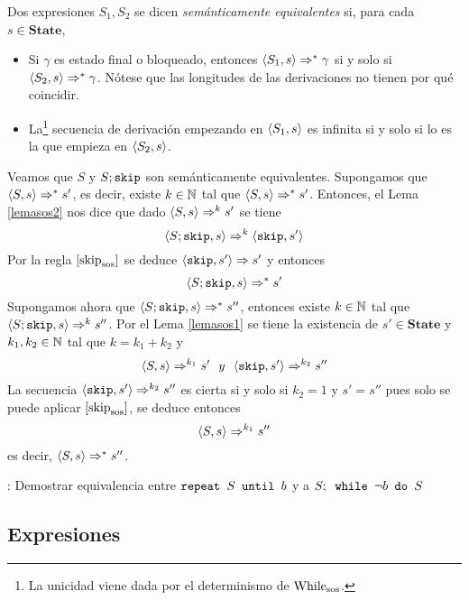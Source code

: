 \begin{definition}
Dos expresiones $S_1, S_2$ se dicen \textit{semánticamente equivalentes} si, para cada $s \in \mathbf{State}$, 
\begin{itemize}
    \item Si $\gamma$ es estado final o bloqueado, entonces $\langle S_1, s \rangle\Rightarrow^* \gamma$ si y solo si $\langle S_2, s \rangle \Rightarrow^*\gamma$. Nótese que las longitudes de las derivaciones no tienen por qué coincidir.
    \item La\footnote{La unicidad viene dada por el determinismo de $\mathrm{While}_{\mathrm{sos}}$.} secuencia de derivación empezando en $\langle S_1, s \rangle$ es infinita si y solo si lo es la que empieza en $\langle S_2, s \rangle$.
\end{itemize} 
\end{definition}

\begin{example}
Veamos que $S$ y $S; \texttt{skip}$ son semánticamente equivalentes. Supongamos que $\langle S, s \rangle\Rightarrow^*s'$, es decir, existe $k\in\mathbb{N}$ tal que $\langle S, s \rangle\Rightarrow^*s'$. Entonces, el Lema \ref{lemasos2} nos dice que dado $\langle S, s \rangle\Rightarrow^k s'$ se tiene
\[
    \langle S; \texttt{skip}, s \rangle\Rightarrow^k \langle  \texttt{skip}, s' \rangle
\]
Por la regla $[\mathrm{skip}_{\mathrm{sos}}]$ se deduce $\langle  \texttt{skip}, s' \rangle \Rightarrow s'$ y entonces
\[
    \langle S;  \texttt{skip}, s \rangle \Rightarrow^* s'
\]
Supongamos ahora que $\langle S; \texttt{skip}, s \rangle\Rightarrow^*s''$, entonces existe $k\in\mathbb{N}$ tal que  $\langle S; \texttt{skip}, s \rangle\Rightarrow^k s''$. Por el Lema \ref{lemasos1} se tiene la existencia de $s'\in\textbf{State}$ y $k_1,k_2\in\mathbb{N}$ tal que $k = k_1 + k_2$ y
\[
    \la{S}{s}\dto^{k_1} s'\ \ y\ \ \la{\n{skip}}{s'}\dto^{k_2} s''
\]
La secuencia $\langle \texttt{skip}, s' \rangle\Rightarrow^{k_2} s''$ es cierta si y solo si $k_2 = 1$ y $s' = s''$ pues solo se puede aplicar $[\mathrm{skip}_{\mathrm{sos}}]$, se deduce entonces
\[
    \langle S, s \rangle\Rightarrow^{k_1} s''
\]
es decir, $\langle S, s \rangle\Rightarrow^{*} s''$.
\end{example}

\begin{example}: Demostrar equivalencia entre  $\texttt{repeat }S\texttt{ until }b$ y a $S;\texttt{ while }\neg b\texttt{ do } S$
\end{example}
\subsection{Expresiones}

